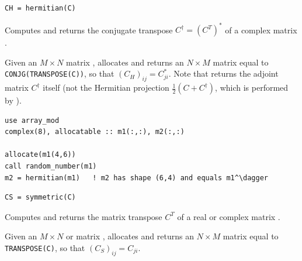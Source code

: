 \lstset{language=[95]Fortran}
\begin{lstlisting}
CH = hermitian(C)
\end{lstlisting}

Computes and returns the conjugate transpose $C^\dagger = (C^T)^*$ of a complex matrix .

Given an $M\times N$  matrix ,  allocates and returns an $N\times M$  matrix  equal to \texttt{CONJG(TRANSPOSE(C))}, so that $(C_H)_{ij} = C_{ji}^*$. Note that  returns the adjoint matrix $C^\dagger$ itself (not the Hermitian projection $\frac{1}{2}(C+C^\dagger)$, which is performed by ).

\begin{description}[leftmargin=2.2cm, style=nextline]
\end{description}

\lstset{language=[95]Fortran}
\begin{lstlisting}
use array_mod
complex(8), allocatable :: m1(:,:), m2(:,:)

allocate(m1(4,6))
call random_number(m1)
m2 = hermitian(m1)   ! m2 has shape (6,4) and equals m1^\dagger
\end{lstlisting}


\lstset{language=[95]Fortran}
\begin{lstlisting}
CS = symmetric(C)
\end{lstlisting}

Computes and returns the matrix transpose $C^T$ of a real or complex matrix .

Given an $M\times N$  or  matrix ,  allocates and returns an $N\times M$ matrix  equal to \texttt{TRANSPOSE(C)}, so that $(C_S)_{ij} = C_{ji}$.

